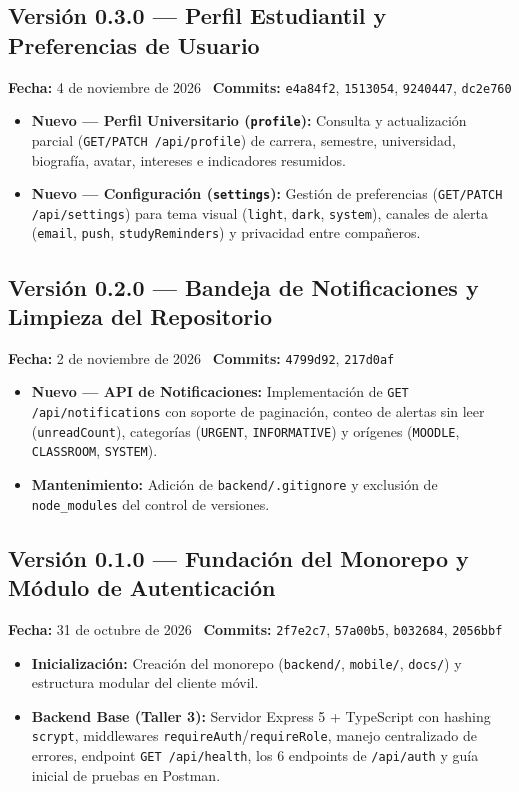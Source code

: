\documentclass[11pt,letterpaper]{article}
\begin{document}
\subsection*{\textcolor{carmesiVivido}{Versión 0.3.0} --- Perfil Estudiantil y Preferencias de Usuario}
\textbf{Fecha:} 4 de noviembre de 2026 \textbar\ \textbf{Commits:} \texttt{e4a84f2}, \texttt{1513054}, \texttt{9240447}, \texttt{dc2e760}
\begin{itemize}[leftmargin=1.5em, itemsep=2pt]
  \item \textbf{Nuevo --- Perfil Universitario (\texttt{profile}):} Consulta y actualización parcial (\texttt{GET/PATCH /api/profile}) de carrera, semestre, universidad, biografía, avatar, intereses e indicadores resumidos.
  \item \textbf{Nuevo --- Configuración (\texttt{settings}):} Gestión de preferencias (\texttt{GET/PATCH /api/settings}) para tema visual (\texttt{light}, \texttt{dark}, \texttt{system}), canales de alerta (\texttt{email}, \texttt{push}, \texttt{studyReminders}) y privacidad entre compañeros.
\end{itemize}

\subsection*{\textcolor{carmesiVivido}{Versión 0.2.0} --- Bandeja de Notificaciones y Limpieza del Repositorio}
\textbf{Fecha:} 2 de noviembre de 2026 \textbar\ \textbf{Commits:} \texttt{4799d92}, \texttt{217d0af}
\begin{itemize}[leftmargin=1.5em, itemsep=2pt]
  \item \textbf{Nuevo --- API de Notificaciones:} Implementación de \texttt{GET /api/notifications} con soporte de paginación, conteo de alertas sin leer (\texttt{unreadCount}), categorías (\texttt{URGENT}, \texttt{INFORMATIVE}) y orígenes (\texttt{MOODLE}, \texttt{CLASSROOM}, \texttt{SYSTEM}).
  \item \textbf{Mantenimiento:} Adición de \texttt{backend/.gitignore} y exclusión de \texttt{node\_modules} del control de versiones.
\end{itemize}

\subsection*{\textcolor{carmesiVivido}{Versión 0.1.0} --- Fundación del Monorepo y Módulo de Autenticación}
\textbf{Fecha:} 31 de octubre de 2026 \textbar\ \textbf{Commits:} \texttt{2f7e2c7}, \texttt{57a00b5}, \texttt{b032684}, \texttt{2056bbf}
\begin{itemize}[leftmargin=1.5em, itemsep=2pt]
  \item \textbf{Inicialización:} Creación del monorepo (\texttt{backend/}, \texttt{mobile/}, \texttt{docs/}) y estructura modular del cliente móvil.
  \item \textbf{Backend Base (Taller 3):} Servidor Express 5 + TypeScript con hashing \texttt{scrypt}, middlewares \texttt{requireAuth}/\texttt{requireRole}, manejo centralizado de errores, endpoint \texttt{GET /api/health}, los 6 endpoints de \texttt{/api/auth} y guía inicial de pruebas en Postman.
\end{itemize}
\end{document}

